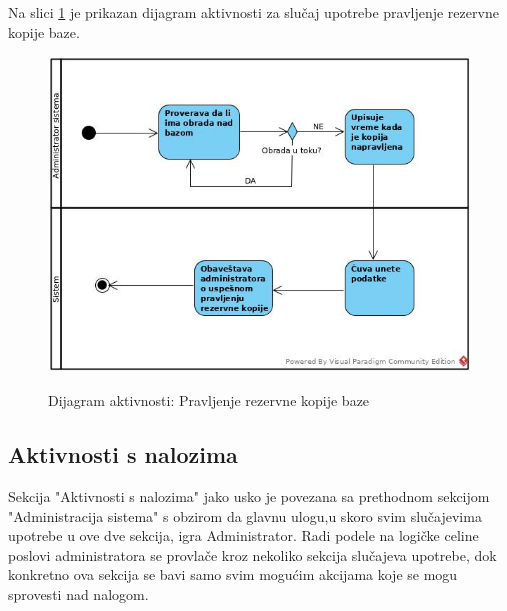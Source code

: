 \documentclass[20pt]{article}
\begin{document}
\setlength{\parindent}{1cm}
\fontsize{13}{18} \selectfont 
Na slici \ref{fig:dijagramAktivnostiKopiranjaBaze} je prikazan dijagram aktivnosti za slu\v{c}aj upotrebe pravljenje rezervne kopije baze.\\

\begin{figure}[h]
        \centering
        \includegraphics[width=1.1\textwidth,height=0.59\textheight]{Pictures/PravljenjeRezervneKopije.jpg}\\
        \caption{Dijagram aktivnosti: Pravljenje rezervne kopije baze}
        \label{fig:dijagramAktivnostiKopiranjaBaze}
    \end{figure}
\newpage
\subsection{\bfseries \Large Aktivnosti s nalozima}
\setlength{\parindent}{1cm}
\fontsize{13}{18} \selectfont 

\indent Sekcija "Aktivnosti s nalozima" jako usko je povezana sa prethodnom sekcijom "Administracija sistema" s obzirom da glavnu ulogu,u skoro svim slu\v {c}ajevima upotrebe u ove dve sekcija, igra Administrator. Radi podele na logi\v {c}ke celine poslovi administratora se provla\v {c}e kroz nekoliko sekcija slu\v {c}ajeva upotrebe, dok konkretno ova sekcija se bavi samo svim mogu\' cim akcijama koje se mogu sprovesti nad nalogom.\\
\end{document}
